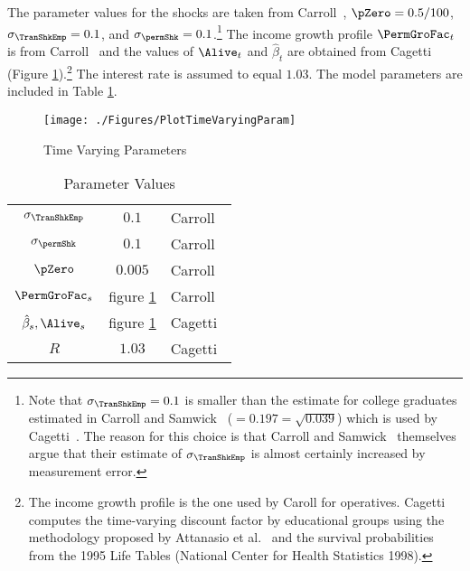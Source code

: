 The parameter values for the shocks are taken from Carroll~\citeyearpar{carroll:brookings}, $\pZero=0.5/100$, $\sigma _{\TranShkEmp }=0.1$, and $\sigma_{\permShk}=0.1$.\footnote{Note that $\sigma _{\TranShkEmp}=0.1$ is smaller than the estimate for college graduates estimated in
  Carroll and Samwick~\citeyearpar{carroll&samwick:nature} ($=0.197=\sqrt{0.039}$) which is used by Cagetti~\citeyearpar{cagettiWprofiles}. The reason for this choice is that Carroll and Samwick~\citeyearpar{carroll&samwick:nature} themselves argue that their estimate of $\sigma_{\TranShkEmp }$ is almost certainly increased by measurement error.} The income growth profile $\PermGroFac_{t}$ is from Carroll~\citeyearpar{carrollBSLCPIH} and the values of $\Alive_{t}$ and $\hat{\beta}_{t}$ are obtained from Cagetti~\citeyearpar{cagettiWprofiles} (Figure \ref{fig:TimeVaryingParam}).\footnote{The income growth profile is the one used by Caroll for operatives. Cagetti computes the time-varying discount factor by educational groups using the methodology proposed by Attanasio et al.~\citeyearpar{AttanasioBanksMeghirWeber} and the survival probabilities from the 1995 Life Tables (National Center for Health Statistics 1998).} The interest rate is assumed to equal $1.03$. The model parameters are included in Table \ref{table:StrEstParams}.

\hypertarget{PlotTimeVaryingParam}{}
\begin{figure}[h]
  \texttt{[image: ./Figures/PlotTimeVaryingParam]}
  \caption{Time Varying Parameters}
  \label{fig:TimeVaryingParam}
\end{figure}

\begin{table}[h]
  \caption{Parameter Values}\label{table:StrEstParams}
  \begin{center}
    \begin{tabular}{ccl}
      \hline\hline
      $\sigma _{\TranShkEmp}$    & $0.1$ & Carroll~\citeyearpar{carroll:brookings}
      \\ $\sigma _{\permShk}$   & $0.1$ & Carroll~\citeyearpar{carroll:brookings}
      \\ $\pZero$           & $0.005$  & Carroll~\citeyearpar{carroll:brookings}
      \\ $\PermGroFac_{s}$        & figure \ref{fig:TimeVaryingParam} & Carroll~\citeyearpar{carrollBSLCPIH}
      \\ $\hat{\beta}_{s},\Alive_{s}$ & figure \ref{fig:TimeVaryingParam} & Cagetti~\citeyearpar{cagettiWprofiles}
      \\$R$            & $1.03$  & Cagetti~\citeyearpar{cagettiWprofiles}\\
      \hline
    \end{tabular}
  \end{center}
\end{table}

